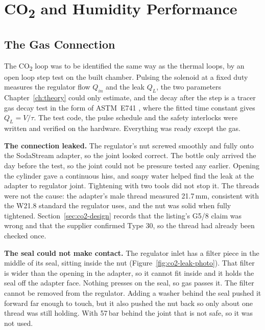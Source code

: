 \chapter{CO\textsubscript{2} and Humidity Performance}
\label{ch:co2humidity}

\section{The Gas Connection}
\label{sec:co2c-failure}

The CO\textsubscript{2} loop was to be identified the same way as the thermal loops, by an open loop step test on the built chamber. Pulsing the solenoid at a fixed duty measures the regulator flow $Q_{in}$ and the leak $Q_L$, the two parameters Chapter~\ref{ch:theory} could only estimate, and the decay after the step is a tracer gas decay test in the form of ASTM~E741 \citep{astm_e741}, where the fitted time constant gives $Q_L = V/\tau$. The test code, the pulse schedule and the safety interlocks were written and verified on the hardware. Everything was ready except the gas.

\textbf{The connection leaked.} The regulator's nut screwed smoothly and fully onto the SodaStream adapter, so the joint looked correct. The bottle only arrived the day before the test, so the joint could not be pressure tested any earlier. Opening the cylinder gave a continuous hiss, and soapy water helped find the leak at the adapter to regulator joint. Tightening with two tools did not stop it. The threads were not the cause: the adapter's male thread measured 21.7\,mm, consistent with the W21.8 standard the regulator uses, and the nut was solid when fully tightened. Section~\ref{sec:co2-design} records that the listing's G5/8 claim was wrong and that the supplier confirmed Type 30, so the thread had already been checked once.

\textbf{The seal could not make contact.} The regulator inlet has a filter piece in the middle of its seal, sitting inside the nut (Figure~\ref{fig:co2-leak-photo}). That filter is wider than the opening in the adapter, so it cannot fit inside and it holds the seal off the adapter face. Nothing presses on the seal, so gas passes it. The filter cannot be removed from the regulator. Adding a washer behind the seal pushed it forward far enough to touch, but it also pushed the nut back so only about one thread was still holding. With 57\,bar behind the joint that is not safe, so it was not used.

